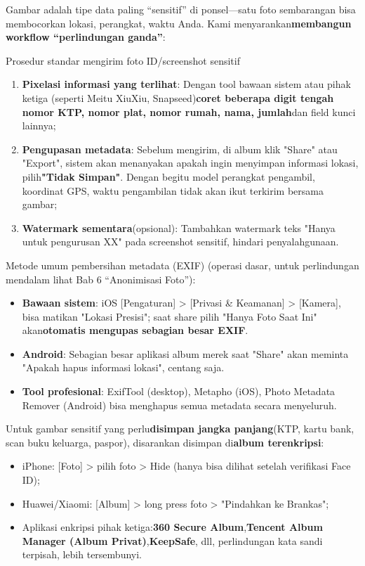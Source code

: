 
Gambar adalah tipe data paling “sensitif” di ponsel—satu foto sembarangan bisa membocorkan lokasi, perangkat, waktu Anda. Kami menyarankan\textbf{membangun workflow “perlindungan ganda”}:

\begin{tcbwarn}{Prosedur standar mengirim foto ID/screenshot sensitif}
\begin{enumerate}
  \item \textbf{Pixelasi informasi yang terlihat}: Dengan tool bawaan sistem atau pihak ketiga (seperti Meitu XiuXiu, Snapseed)\textbf{coret beberapa digit tengah nomor KTP, nomor plat, nomor rumah, nama, jumlah}dan field kunci lainnya;
  \item \textbf{Pengupasan metadata}: Sebelum mengirim, di album klik "Share" atau "Export", sistem akan menanyakan apakah ingin menyimpan informasi lokasi, pilih\textbf{"Tidak Simpan"}. Dengan begitu model perangkat pengambil, koordinat GPS, waktu pengambilan tidak akan ikut terkirim bersama gambar;
  \item \textbf{Watermark sementara}(opsional): Tambahkan watermark teks "Hanya untuk pengurusan XX" pada screenshot sensitif, hindari penyalahgunaan.
\end{enumerate}

\end{tcbwarn}

Metode umum pembersihan metadata (EXIF) (operasi dasar, untuk perlindungan mendalam lihat Bab 6 “Anonimisasi Foto”):

\begin{itemize}
  \item \textbf{Bawaan sistem}: iOS [Pengaturan] > [Privasi \& Keamanan] > [Kamera], bisa matikan "Lokasi Presisi"; saat share pilih "Hanya Foto Saat Ini" akan\textbf{otomatis mengupas sebagian besar EXIF}.
  \item \textbf{Android}: Sebagian besar aplikasi album merek saat "Share" akan meminta "Apakah hapus informasi lokasi", centang saja.
  \item \textbf{Tool profesional}: ExifTool (desktop), Metapho (iOS), Photo Metadata Remover (Android) bisa menghapus semua metadata secara menyeluruh.
\end{itemize}

Untuk gambar sensitif yang perlu\textbf{disimpan jangka panjang}(KTP, kartu bank, scan buku keluarga, paspor), disarankan disimpan di\textbf{album terenkripsi}:

\begin{itemize}
  \item iPhone: [Foto] > pilih foto > Hide (hanya bisa dilihat setelah verifikasi Face ID);
  \item Huawei/Xiaomi: [Album] > long press foto > "Pindahkan ke Brankas";
  \item Aplikasi enkripsi pihak ketiga:\textbf{360 Secure Album},\textbf{Tencent Album Manager (Album Privat)},\textbf{KeepSafe}, dll, perlindungan kata sandi terpisah, lebih tersembunyi.
\end{itemize}
